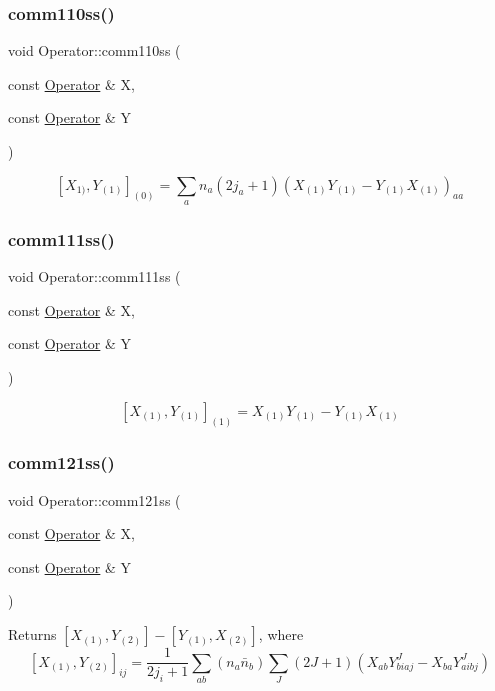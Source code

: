 \subsubsection{\texorpdfstring{comm110ss()}{comm110ss()}}
{\footnotesize\ttfamily void Operator\+::comm110ss (\begin{DoxyParamCaption}\item[{const \hyperlink{classOperator}{Operator} \&}]{X,  }\item[{const \hyperlink{classOperator}{Operator} \&}]{Y }\end{DoxyParamCaption})}

\[ [X_{1)},Y_{(1)}]_{(0)} = \sum_{a} n_a (2j_a+1) \left(X_{(1)}Y_{(1)}-Y_{(1)}X_{(1)}\right)_{aa} \] \mbox{\label{classOperator_ae22e28ebda5b170f2cdc4d2d9462971a}} 
\subsubsection{\texorpdfstring{comm111ss()}{comm111ss()}}
{\footnotesize\ttfamily void Operator\+::comm111ss (\begin{DoxyParamCaption}\item[{const \hyperlink{classOperator}{Operator} \&}]{X,  }\item[{const \hyperlink{classOperator}{Operator} \&}]{Y }\end{DoxyParamCaption})}

\[ [X_{(1)},Y_{(1)}]_{(1)} = X_{(1)}Y_{(1)} - Y_{(1)}X_{(1)} \] \mbox{\label{classOperator_af80e0152e9dffb0194b8b26c5d75d815}} 
\subsubsection{\texorpdfstring{comm121ss()}{comm121ss()}}
{\footnotesize\ttfamily void Operator\+::comm121ss (\begin{DoxyParamCaption}\item[{const \hyperlink{classOperator}{Operator} \&}]{X,  }\item[{const \hyperlink{classOperator}{Operator} \&}]{Y }\end{DoxyParamCaption})}

Returns $ [X_{(1)},Y_{(2)}] - [Y_{(1)},X_{(2)}] $, where \[ [X_{(1)},Y_{(2)}]_{ij} = \frac{1}{2j_i+1}\sum_{ab} (n_a \bar{n}_b) \sum_{J} (2J+1) (X_{ab} Y^J_{biaj} - X_{ba} Y^J_{aibj}) \] \mbox{\label{classOperator_a4f4738296848a6d504c331456f361736}} 
